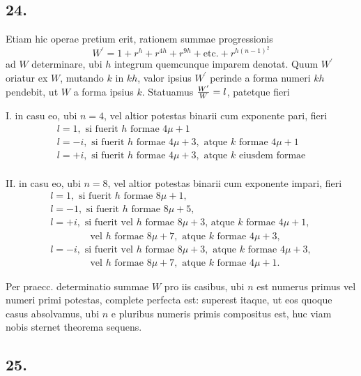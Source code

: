 \documentclass[twoside,12pt]{memoir}
\let\oldfrac\frac
\def\frac#1#2{\mathchoice{\tfrac{#1}{#2}}{\oldfrac{#1}{#2}}{\genfrac{}{}{}{2}{#1}{#2\mathstrut}}{\genfrac{}{}{}{3}{#1}{#2\mathstrut}}}
\begin{document}
\subsection*{24.}
 
Etiam hic operae pretium erit, rationem summae progressionis
\[W^{\prime}=1+r^{h}+r^{4 h}+r^{9 h}+\text{etc.}+r^{h(n-1)^{2}}\]
ad \(W\) determinare, ubi \(h\) integrum quemcunque imparem denotat. Quum \(W^{\prime}\) oriatur ex \(W\), mutando \(k\) in \(k h\), valor ipsius \(W^{\prime}\) perinde a forma numeri \(k h\) pendebit, ut \(W\) a forma ipsius \(k\). Statuamus \(\frac{W^{\prime}}{W}=l\), patetque fieri
 
I. in casu eo, ubi \(n=4\), vel altior potestas binarii cum exponente pari, fieri\\
\[\begin{array}{l}
l=1,\text{ si fuerit }h\text{ formae }4\mu+1\\ 
l=-i,\text{ si fuerit }h\text{ formae }4 \mu+3,\text{ atque }k\text{ formae }4 \mu+1\\
l=+i,\text{ si fuerit }h\text{ formae }4 \mu+3,\text{ atque }k\text{ eiusdem formae}\\
\end{array}\]\pagebreak%
 
II. in casu eo, ubi \(n=8\), vel altior potestas binarii cum exponente impari, fieri
\[\begin{array}{l} 
l=1, \text{ si fuerit } h \text{ formae } 8 \mu+1, \\
l=-1, \text{ si fuerit } h \text{ formae } 8 \mu+5, \\
l=+i, \text{ si fuerit vel } h \text{ formae } 8 \mu+3 \text{, atque } k \text{ formae } 4 \mu+1,\\
\phantom{l=+i} \quad \text{ vel } h \text{ formae } 8 \mu+7, \text{ atque } k \text{ formae } 4 \mu+3,\\
l=-i, \text{ si fuerit vel } h \text{ formae } 8 \mu+3, \text{ atque } k \text{ formae } 4 \mu+3, \\
\phantom{l=-i}\quad \text{ vel } h \text{ formae } 8 \mu+7, \text{ atque } k \text{ formae } 4 \mu+1.
\end{array}\]
 
Per praecc. determinatio summae \(W\) pro iis casibus, ubi \(n\) est numerus primus vel numeri primi potestas, complete perfecta est: superest itaque, ut eos quoque casus absolvamus, ubi \(n\) e pluribus numeris primis compositus est, huc viam nobis sternet theorema sequens.

\subsection*{25.}
 
\end{document}
